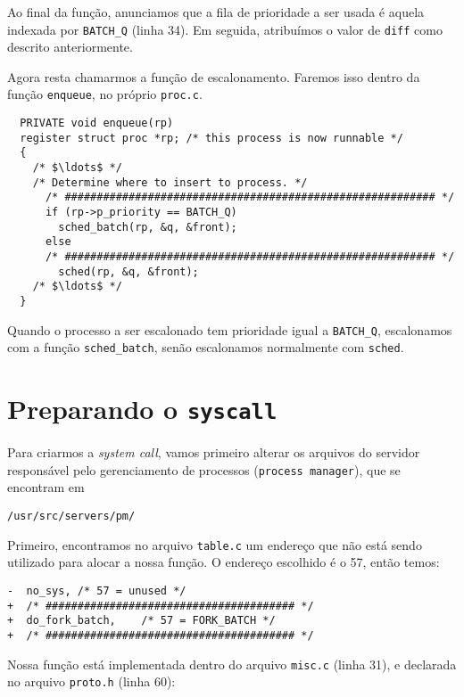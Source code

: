 \documentclass{amsart}
\theoremstyle{plain}
\newcommand{\code}[1]{\lstinline[mathescape=true]{#1}}
\begin{document}
Ao final da função, anunciamos que a fila de prioridade a ser usada é aquela indexada por
\code{BATCH_Q} (linha 34). Em seguida, atribuímos o valor de \code{diff} como descrito
anteriormente.

Agora resta chamarmos a função de escalonamento. Faremos isso dentro da função \code{enqueue}, no
próprio \code{proc.c}.

\begin{verbatim}
  PRIVATE void enqueue(rp)
  register struct proc *rp; /* this process is now runnable */
  {
    /* $\ldots$ */
    /* Determine where to insert to process. */
      /* ########################################################## */
      if (rp->p_priority == BATCH_Q)
        sched_batch(rp, &q, &front);
      else
      /* ########################################################## */
        sched(rp, &q, &front);
    /* $\ldots$ */
  }
\end{verbatim}

Quando o processo a ser escalonado tem prioridade igual a \code{BATCH_Q}, escalonamos com a função
\code{sched_batch}, senão escalonamos normalmente com \code{sched}.

\section{Preparando o \code{syscall}}

Para criarmos a \textit{system call}, vamos primeiro alterar os arquivos do servidor responsável
pelo gerenciamento de processos (\code{process manager}), que se encontram em

\begin{lstlisting}[frame=leftline,mathescape=true,style=nonumbers]
/usr/src/servers/pm/
\end{lstlisting}

Primeiro, encontramos no arquivo \code{table.c} um endereço que não está sendo utilizado para
alocar a nossa função. O endereço escolhido é o 57, então temos:

\begin{lstlisting}[frame=leftline,mathescape=true,style=nonumbers]
-  no_sys, /* 57 = unused */
+  /* ####################################### */
+  do_fork_batch,    /* 57 = FORK_BATCH */
+  /* ####################################### */
\end{lstlisting}

Nossa função está implementada dentro do arquivo \code{misc.c} (linha 31), e declarada no arquivo
\code{proto.h} (linha 60):
\end{document}
